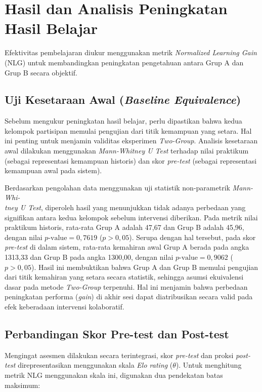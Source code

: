 \section{Hasil dan Analisis Peningkatan Hasil Belajar}
\label{sec:hasil_belajar}

Efektivitas pembelajaran diukur menggunakan metrik \textit{Normalized Learning Gain} (NLG) untuk membandingkan peningkatan pengetahuan antara Grup A dan Grup B secara objektif.

\subsection{Uji Kesetaraan Awal (\textit{Baseline Equivalence})}
Sebelum mengukur peningkatan hasil belajar, perlu dipastikan bahwa kedua kelompok partisipan memulai pengujian dari titik kemampuan yang setara. Hal ini penting untuk menjamin validitas eksperimen \textit{Two-Group}. Analisis kesetaraan awal dilakukan menggunakan \textit{Mann-Whitney U Test} terhadap nilai praktikum (sebagai representasi kemampuan historis) dan skor \textit{pre-test} (sebagai representasi kemampuan awal pada sistem).

Berdasarkan pengolahan data menggunakan uji statistik non-parametrik \textit{Mann-Whi-\\tney U Test}, diperoleh hasil yang menunjukkan tidak adanya perbedaan yang signifikan antara kedua kelompok sebelum intervensi diberikan. Pada metrik nilai praktikum historis, rata-rata Grup A adalah 47,67 dan Grup B adalah 45,96, dengan nilai $p\text{-value} = 0,7619$ ($p > 0,05$). Serupa dengan hal tersebut, pada skor \textit{pre-test} di dalam sistem, rata-rata kemahiran awal Grup A berada pada angka 1313,33 dan Grup B pada angka 1300,00, dengan nilai $p\text{-value} = 0,9062$ ($p > 0,05$). Hasil ini membuktikan bahwa Grup A dan Grup B memulai pengujian dari titik kemahiran yang setara secara statistik, sehingga asumsi ekuivalensi dasar pada metode \textit{Two-Group} terpenuhi. Hal ini menjamin bahwa perbedaan peningkatan performa (\textit{gain}) di akhir sesi dapat diatribusikan secara valid pada efek keberadaan intervensi kolaboratif.

\subsection{Perbandingan Skor Pre-test dan Post-test}
Mengingat asesmen dilakukan secara terintegrasi, skor \textit{pre-test} dan proksi \textit{post-test} direpresentasikan menggunakan skala \textit{Elo rating} ($\theta$). Untuk menghitung metrik NLG menggunakan skala ini, digunakan dua pendekatan batas maksimum: 

